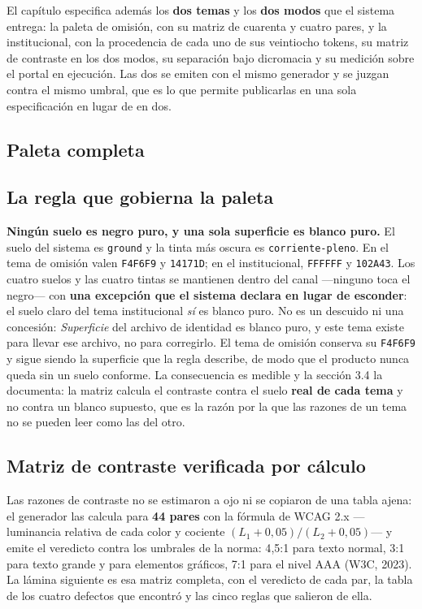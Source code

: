 El capítulo especifica además los \textbf{dos temas} y los \textbf{dos modos} que el sistema
entrega: la paleta de omisión, con su matriz de cuarenta y cuatro pares, y la institucional, con la
procedencia de cada uno de sus veintiocho tokens, su matriz de contraste en los dos modos, su
separación bajo dicromacia y su medición sobre el portal en ejecución. Las dos se emiten con el
mismo generador y se juzgan contra el mismo umbral, que es lo que permite publicarlas en una sola
especificación en lugar de en dos.

\subsection{Paleta completa}

\laminaPaleta

\subsection{La regla que gobierna la paleta}

\textbf{Ningún suelo es negro puro, y una sola superficie es blanco puro.} El suelo del sistema es \texttt{ground} y la tinta más oscura es \texttt{corriente-pleno}. En el tema de omisión valen \texttt{F4F6F9} y \texttt{14171D}; en el institucional, \texttt{FFFFFF} y \texttt{102A43}. Los cuatro suelos y las cuatro tintas se mantienen dentro del canal ---ninguno toca el negro--- con \textbf{una excepción que el sistema declara en lugar de esconder}: el suelo claro del tema institucional \emph{sí} es blanco puro. No es un descuido ni una concesión: \emph{Superficie} del archivo de identidad es blanco puro, y este tema existe para llevar ese archivo, no para corregirlo. El tema de omisión conserva su \texttt{F4F6F9} y sigue siendo la superficie que la regla describe, de modo que el producto nunca queda sin un suelo conforme. La consecuencia es medible y la sección 3.4 la documenta: la matriz calcula el contraste contra el suelo \textbf{real de cada tema} y no contra un blanco supuesto, que es la razón por la que las razones de un tema no se pueden leer como las del otro.

\subsection{Matriz de contraste verificada por cálculo}

Las razones de contraste no se estimaron a ojo ni se copiaron de una tabla ajena: el generador las calcula para \textbf{44 pares} con la fórmula de WCAG 2.x ---luminancia relativa de cada color y cociente $(L_1+0{,}05)/(L_2+0{,}05)$--- y emite el veredicto contra los umbrales de la norma: 4{,}5:1 para texto normal, 3:1 para texto grande y para elementos gráficos, 7:1 para el nivel AAA (W3C, 2023). La lámina siguiente es esa matriz completa, con el veredicto de cada par, la tabla de los cuatro defectos que encontró y las cinco reglas que salieron de ella.

